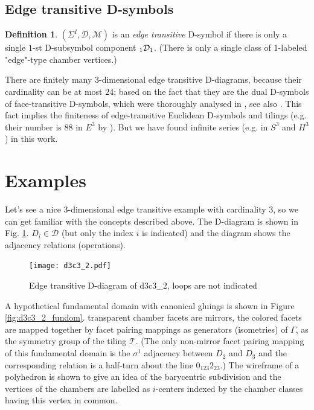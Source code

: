 \documentclass[12pt,a4paper]{article}
\numberwithin{equation}{section}
\newcommand{\leftsub}[2]{{\vphantom{#2}}_{#1}{#2}}
\theoremstyle{plain}%
\newtheorem{prop}[thm]{Proposition}
\theoremstyle{definition}
\newtheorem{defn}{Definition}[section]
\theoremstyle{remark}
\begin{document}

\subsection{Edge transitive D-symbols}
\label{sec:edge_transitive}

\begin{defn}
  $(\Sigma^I,\mathcal{D},\mathcal{M})$ is an {\em edge transitive} D-symbol if
  there is only a single $1$-st D-subsymbol component $\leftsub{1}{\mathcal{D}}_1$. (There is only a single class of
  $1$-labeled "edge"-type chamber vertices.)
\end{defn}

There are finitely many $3$-dimensional edge transitive D-diagrams, because their
cardinality can be at most $24$; based on the fact that they are the dual
D-symbols of face-transitive D-symbols, which were thoroughly analysed in
\cite{DHM93}, see also \cite{DDH98}. This fact implies the finiteness of edge-transitive
Euclidean D-symbols and tilings (e.g. their number is $88$ in $E^3$ by
\cite{DHM93}). But we have found infinite series (e.g. in $S^3$ and $H^3$) in this work.

\section{Examples}

Let's see a nice $3$-dimensional edge transitive example with cardinality $3$,
so we can get familiar with the concepts described above. The D-diagram is shown
in Fig.  \ref{fig:d3c3_2}. $D_i\in \mathcal{D}$ (but only the index $i$ is
indicated) and the diagram shows the adjacency relations (operations).

\begin{figure}
  \caption{\label{fig:d3c3_2} Edge transitive D-diagram of d3c3\_2, loops are not indicated}
  \center
  \texttt{[image: d3c3\_2.pdf]}
\end{figure}

A hypothetical fundamental domain with canonical gluings is shown in Figure \ref{fig:d3c3_2_fundom}.
transparent chamber facets are mirrors, the colored facets are mapped together
by facet pairing mappings as generators (isometries) of $\Gamma$, as the
symmetry group of the tiling $\mathcal{T}$. (The only non-mirror facet pairing
mapping of this fundamental domain is the $\sigma^1$ adjacency between $D_2$
and $D_3$ and the corresponding relation is a half-turn about the line
$0_{123}2_{23}$.) The wireframe of a polyhedron is shown to give an idea of the
barycentric subdivision and the vertices of the chambers are labelled as
$i$-centers indexed by the chamber classes having this vertex in common.
\end{document}
